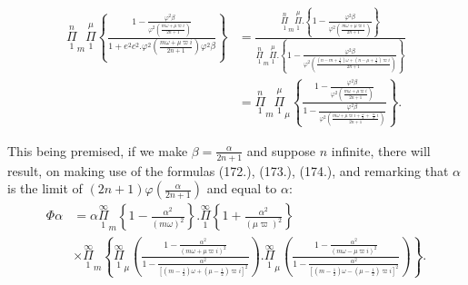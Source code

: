 \documentclass{article}
\begin{document}
\[ \begin{aligned}\overset{n}{\underset{1}{\Pi}}_{m}\overset{\mu}{\underset{1}{\Pi}}\left\{\frac{1-\frac{\varphi^{2}\beta}{\varphi^{2}\left(\frac{m\omega+\mu\varpi i}{2n+1}\right)}}{1+e^{2}c^{2}.\varphi^{2}\left(\frac{m\omega+\mu\varpi i}{2n+1}\right)\varphi^{2}\beta}\right\}&=\frac{\overset{n}{\underset{1}{\Pi}}_{m}\overset{\mu}{\underset{1}{\Pi}}.\left\{1-\frac{\varphi^{2}\beta}{\varphi^{2}\left(\frac{m\omega+\mu\varpi i}{2n+1}\right)}\right\}}{\overset{n}{\underset{1}{\Pi}}_{m}\overset{\mu}{\underset{1}{\Pi}}.\left\{1-\frac{\varphi^{2}\beta}{\varphi^{2}\left(\frac{(n-m+\tfrac{1}{2})\omega+(n-\mu+\tfrac{1}{2})\varpi i}{2n+1}\right)}\right\}}\\ &=\overset{n}{\underset{1}{\Pi}}_{m}\overset{\mu}{\underset{1}{\Pi}}_{\mu}\left\{\frac{1-\frac{\varphi^{2}\beta}{\varphi^{2}\left(\frac{m\omega+\mu\varpi i}{2n+1}\right)}}{1-\frac{\varphi^{2}\beta}{\varphi^{2}\left(\frac{m\omega+\mu\varpi i+\frac{\omega}{2}+\frac{\varpi}{2}i}{2n+1}\right)}}\right\}.\end{aligned} \]

This being premised, if we make $\beta=\frac{\alpha}{2n+1}$ and suppose $n$ infinite, there will result, on making use of the formulas (172.), (173.), (174.), and remarking that $\alpha$ is the limit of $(2n+1)\varphi\left(\frac{\alpha}{2n+1}\right)$ and equal to $\alpha$:
\[ \begin{aligned}\Phi\alpha&=\alpha\overset{\infty}{\underset{1}{\Pi}}_{m}\left\{1-\frac{\alpha^{2}}{(m\omega)^{2}}\right\}.\overset{\infty}{\underset{1}{\Pi}}\left\{1+\frac{\alpha^{2}}{(\mu\varpi)^{2}}\right\}\\ &\times\overset{\infty}{\underset{1}{\Pi}}_{m}\left\{\overset{\infty}{\underset{1}{\Pi}}_{\mu}\left(\frac{1-\frac{\alpha^{2}}{(m\omega+\mu\varpi i)^{2}}}{1-\frac{\alpha^{2}}{[(m-\tfrac{1}{2})\omega+(\mu-\tfrac{1}{2})\varpi i]^{2}}}\right).\overset{\infty}{\underset{1}{\Pi}}_{\mu}\left(\frac{1-\frac{\alpha^{2}}{(m\omega-\mu\varpi i)^{2}}}{1-\frac{\alpha^{2}}{[(m-\tfrac{1}{2})\omega-(\mu-\tfrac{1}{2})\varpi i]^{2}}}\right)\right\}.\end{aligned} \tag{175.} \]
\end{document}
